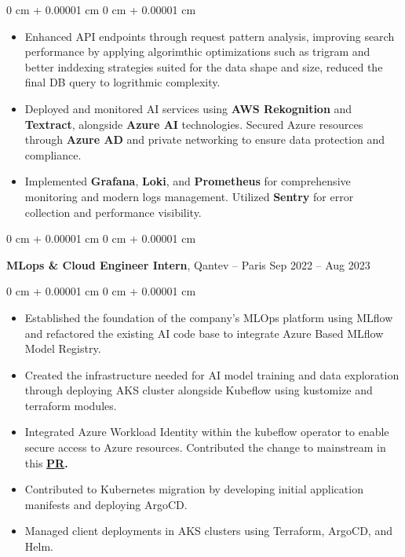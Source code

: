 \documentclass[10pt, letterpaper]{article}
\newenvironment{highlights}{ \begin{itemize}[ topsep=0.10 cm, parsep=0.10 cm, partopsep=0pt,
itemsep=0pt, leftmargin=0 cm + 10pt ] }{ \end{itemize} } %
\newenvironment{onecolentry}{ \begin{adjustwidth}{ 0 cm + 0.00001 cm }{ 0 cm + 0.00001 cm }
}{ \end{adjustwidth} } %
\newenvironment{twocolentry}[2][]{ \onecolentry \def\secondColumn{#2} \setcolumnwidth{\fill, 4.5 cm}
\begin{paracol}{2} }{ \switchcolumn \raggedleft \secondColumn \end{paracol}
\endonecolentry } %
\begin{document}
\begin{onecolentry}
\begin{highlights}
				\item Enhanced API endpoints through request pattern analysis, improving search performance by applying algorimthic optimizations such as trigram and better inddexing strategies suited for the data shape and size, reduced the final DB query to logrithmic complexity.
				
				\item Deployed and monitored AI services using \textbf{AWS Rekognition} and \textbf{Textract}, alongside \textbf{Azure AI} technologies. Secured Azure resources through \textbf{Azure AD} and private networking to ensure data protection and compliance.
				
				\item Implemented \textbf{Grafana}, \textbf{Loki}, and \textbf{Prometheus} for comprehensive monitoring and modern logs management. Utilized \textbf{Sentry} for error collection and performance visibility.
		\end{highlights}
	\end{onecolentry}

	\vspace{0.3 cm}

	\begin{twocolentry}
		{ Sep 2022 – Aug 2023 } \textbf{MLops \& Cloud Engineer Intern}, Qantev --
		Paris
	\end{twocolentry}

	\vspace{0.10 cm}
	\begin{onecolentry}
		\begin{highlights}
			\item Established the foundation of the company's MLOps platform using MLflow and refactored the existing AI code base to integrate Azure Based MLflow Model Registry.
			\item Created the infrastructure needed for AI model training and data exploration through deploying AKS cluster alongside Kubeflow using kustomize and terraform modules. 
			\item Integrated Azure Workload Identity within the kubeflow operator to enable secure access to Azure resources. Contributed the change to mainstream in this \textbf{\href{https://github.com/kubeflow/kubeflow/pull/7091}{PR}.
			}
			\item Contributed to Kubernetes migration by developing initial application manifests and deploying ArgoCD.
			\item Managed client deployments in AKS clusters using Terraform, ArgoCD, and Helm.
		\end{highlights}
	\end{onecolentry}
\end{document}
